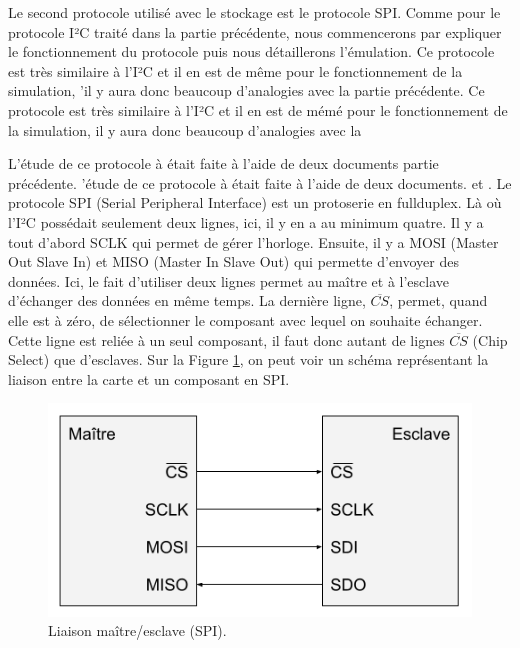 \documentclass[a4paper]{article}
\begin{document}
Le second protocole utilisé avec le stockage est le protocole SPI. Comme pour le
protocole I²C traité dans la partie précédente, nous commencerons par expliquer
le fonctionnement du protocole puis nous détaillerons l'émulation. Ce protocole
est très similaire à l'I²C et il en est de même pour le fonctionnement de la
simulation, 'il y aura donc beaucoup d'analogies avec la partie précédente.
Ce protocole est très similaire à l'I²C et il en est de mémé pour le
fonctionnement de la simulation, il y aura donc beaucoup d'analogies avec la

L'étude de ce protocole à était faite à l'aide de deux documents partie
précédente. 'étude de ce protocole à était faite à l'aide de deux documents.
\cite{dhaker2018introduction} et \cite{li2014design}. Le protocole SPI (Serial
Peripheral Interface) est un \gls{protoserie} en \gls{fullduplex}. Là où l'I²C
possédait seulement deux lignes, ici, il y en a au minimum quatre. Il y a tout
d'abord SCLK qui permet de gérer l'horloge. Ensuite, il y a MOSI (Master Out
Slave In) et MISO (Master In Slave Out) qui permette d'envoyer des données. Ici,
le fait d'utiliser deux lignes permet au maître et à l'esclave d'échanger des
données en même temps. La dernière ligne, $\overline{CS}$, permet, quand elle
est à zéro, de sélectionner le composant avec lequel on souhaite échanger. Cette
ligne est reliée à un seul composant, il faut donc autant de lignes
$\overline{CS}$ (Chip Select) que d'esclaves. Sur la Figure \ref{fig:schemaspi},
on peut voir un schéma représentant la liaison entre la carte et un composant en
SPI.

\begin{figure}[h!]
  \begin{center}
    \includegraphics[scale=0.6]{./img/schema-spi.png}
    \caption{Liaison maître/esclave (SPI).}
    \label{fig:schemaspi}
  \end{center}
\end{figure}
\end{document}
